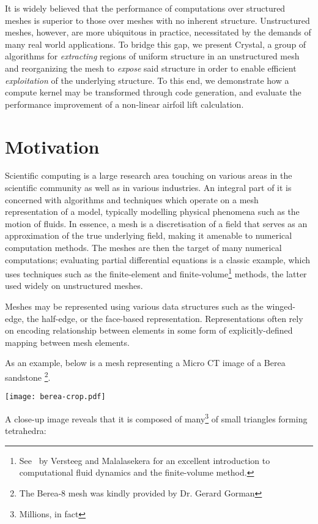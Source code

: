 It is widely believed that the performance of computations over structured meshes is superior to those over meshes with no inherent structure.
Unstructured meshes, however, are more ubiquitous in practice, necessitated by the demands of many real world applications.
To bridge this gap, we present Crystal, a group of algorithms for \emph{extracting} regions of uniform structure in an unstructured mesh and reorganizing the mesh to \emph{expose} said structure in order to enable efficient \emph{exploitation} of the underlying structure.
To this end, we demonstrate how a compute kernel may be transformed through code generation, and evaluate the performance improvement of a non-linear airfoil lift calculation.



\section{Motivation}
Scientific computing is a large research area touching on various areas in the scientific community as well as in various industries. An integral part of it is concerned with algorithms and techniques which operate on a mesh representation of a model, typically modelling physical phenomena such as the motion of fluids. In essence, a mesh is a discretisation of a field that serves as an approximation of the true underlying field, making it amenable to numerical computation methods. The meshes are then the target of many numerical computations; evaluating partial differential equations is a classic example, which uses techniques such as the finite-element and finite-volume\footnote{See~\cite{versteeg2007introduction} by Versteeg and Malalasekera for an excellent introduction to computational fluid dynamics and the finite-volume method.} methods, the latter used widely on unstructured meshes.

Meshes may be represented using various data structures such as the winged-edge, the half-edge, or the face-based representation. Representations often rely on encoding relationship between elements in some form of explicitly-defined mapping between mesh elements.

As an example, below is a mesh representing a Micro CT image of a Berea sandstone \footnote{The Berea-8 mesh was kindly provided by Dr. Gerard Gorman}.


{\centering
\texttt{[image: berea-crop.pdf]}
}

A close-up image reveals that it is composed of many\footnote{Millions, in fact} of small triangles forming tetrahedra:

